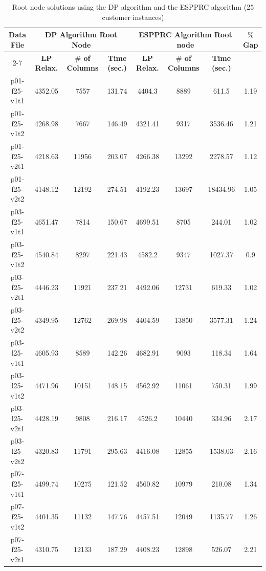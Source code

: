 \begin{table}
\centering
\caption {Root node solutions using the DP algorithm and the ESPPRC algorithm (25 customer instances)} \label{dp-espprc25}
\begin {tabular}[b]{|c|c|c|c|c|c|c|c|}
\hline
{\bf Data File} & \multicolumn{3}{|c|}{{\bf DP Algorithm Root Node}} &  \multicolumn {3}{|c|}{{\bf ESPPRC Algorithm Root node}} & {\bf $\%$Gap}\\ \cline {2-7}
\mbox{} & {\bf LP Relax.} & {\bf $\#$ of Columns} & {\bf	Time (sec.)} &	{\bf LP Relax.}	& {\bf $\#$ of Columns}	& {\bf Time (sec.)} & \mbox{} \\\hline
p01-f25-v1t1	&	4352.05	&	7557	&	131.74	&	4404.3	&	8889	&	611.5	&	1.19	\\\hline
p01-f25-v1t2	&	4268.98	&	7667	&	146.49	&	4321.41	&	9317	&	3536.46	&	1.21	\\\hline
p01-f25-v2t1	&	4218.63	&	11956	&	203.07	&	4266.38	&	13292	&	2278.57	&	1.12	\\\hline
p01-f25-v2t2	&	4148.12	&	12192	&	274.51	&	4192.23	&	13697	&	18434.96	&	1.05	\\\hline \hline
p03-f25-v1t1	&	4651.47	&	7814	&	150.67	&	4699.51	&	8705	&	244.01	&	1.02	\\\hline
p03-f25-v1t2	&	4540.84	&	8297	&	221.43	&	4582.2	&	9347	&	1027.37	&	0.9	\\\hline
p03-f25-v2t1	&	4446.23	&	11921	&	237.21	&	4492.06	&	12731	&	619.33	&	1.02	\\\hline
p03-f25-v2t2	&	4349.95	&	12762	&	269.98	&	4404.59	&	13850	&	3577.31	&	1.24	\\\hline \hline
p03-l25-v1t1	&	4605.93	&	8589	&	142.26	&	4682.91	&	9093	&	118.34	&	1.64	\\\hline
p03-l25-v1t2	&	4471.96	&	10151	&	148.15	&	4562.92	&	11061	&	750.31	&	1.99	\\\hline
p03-l25-v2t1	&	4428.19	&	9808	&	216.17	&	4526.2	&	10440	&	334.96	&	2.17	\\\hline
p03-l25-v2t2	&	4320.83	&	11791	&	295.63	&	4416.08	&	12855	&	1538.03	&	2.16	\\\hline \hline
p07-f25-v1t1	&	4499.74	&	10275	&	121.52	&	4560.82	&	10979	&	210.08	&	1.34	\\\hline
p07-f25-v1t2	&	4401.35	&	11132	&	147.76	&	4457.51	&	12049	&	1135.77	&	1.26	\\\hline
p07-f25-v2t1	&	4310.75	&	12133	&	187.29	&	4408.23	&	12898	&	526.07	&	2.21	\\\hline

\end{tabular}
\end{table}

